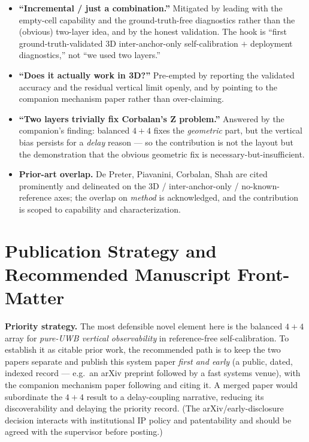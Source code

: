 \documentclass[11pt,a4paper]{article}
\begin{document}
\begin{itemize}
\item \textbf{``Incremental / just a combination.''} Mitigated by leading with the empty-cell
      capability and the ground-truth-free diagnostics rather than the (obvious) two-layer idea, and
      by the honest validation. The hook is ``first ground-truth-validated 3D inter-anchor-only
      self-calibration $+$ deployment diagnostics,'' not ``we used two layers.''
\item \textbf{``Does it actually work in 3D?''} Pre-empted by reporting the validated accuracy and
      the residual vertical limit openly, and by pointing to the companion mechanism paper rather
      than over-claiming.
\item \textbf{``Two layers trivially fix Corbalan's Z problem.''} Answered by the companion's
      finding: balanced $4{+}4$ fixes the \emph{geometric} part, but the vertical bias persists for a
      \emph{delay} reason --- so the contribution is not the layout but the demonstration that the
      obvious geometric fix is necessary-but-insufficient.
\item \textbf{Prior-art overlap.} De Preter, Piavanini, Corbalan, Shah are cited prominently and
      delineated on the 3D / inter-anchor-only / no-known-reference axes; the overlap on
      \emph{method} is acknowledged, and the contribution is scoped to capability and
      characterization.
\end{itemize}

\section{Publication Strategy and Recommended Manuscript Front-Matter}

\textbf{Priority strategy.} The most defensible novel element here is the balanced $4{+}4$ array for
\emph{pure-UWB vertical observability} in reference-free self-calibration. To establish it as citable
prior work, the recommended path is to keep the two papers separate and publish this system paper
\emph{first and early} (a public, dated, indexed record --- e.g.\ an arXiv preprint followed by a
fast systems venue), with the companion mechanism paper following and citing it. A merged paper would
subordinate the $4{+}4$ result to a delay-coupling narrative, reducing its discoverability and
delaying the priority record. (The arXiv/early-disclosure decision interacts with institutional IP
policy and patentability and should be agreed with the supervisor before posting.)
\end{document}
